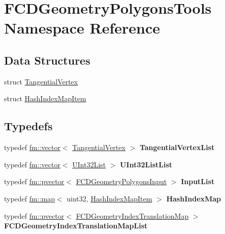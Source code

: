 \hypertarget{namespaceFCDGeometryPolygonsTools}{
\section{FCDGeometryPolygonsTools Namespace Reference}
\label{namespaceFCDGeometryPolygonsTools}
}
\subsection*{Data Structures}
\begin{DoxyCompactItemize}
\item 
struct \hyperlink{structFCDGeometryPolygonsTools_1_1TangentialVertex}{TangentialVertex}
\item 
struct \hyperlink{structFCDGeometryPolygonsTools_1_1HashIndexMapItem}{HashIndexMapItem}
\end{DoxyCompactItemize}
\subsection*{Typedefs}
\begin{DoxyCompactItemize}
\item 
\hypertarget{namespaceFCDGeometryPolygonsTools_a324eb52831fd68edec9f4c53179cef54}{
typedef \hyperlink{classfm_1_1vector}{fm::vector}$<$ \hyperlink{structFCDGeometryPolygonsTools_1_1TangentialVertex}{TangentialVertex} $>$ {\bfseries TangentialVertexList}}
\label{namespaceFCDGeometryPolygonsTools_a324eb52831fd68edec9f4c53179cef54}

\item 
\hypertarget{namespaceFCDGeometryPolygonsTools_af4e70eb8c889999cd7be13dca990efd0}{
typedef \hyperlink{classfm_1_1vector}{fm::vector}$<$ \hyperlink{classfm_1_1vector}{UInt32List} $>$ {\bfseries UInt32ListList}}
\label{namespaceFCDGeometryPolygonsTools_af4e70eb8c889999cd7be13dca990efd0}

\item 
\hypertarget{namespaceFCDGeometryPolygonsTools_ab4f309281805c91af6496bb9bbbc99b2}{
typedef \hyperlink{classfm_1_1pvector}{fm::pvector}$<$ \hyperlink{classFCDGeometryPolygonsInput}{FCDGeometryPolygonsInput} $>$ {\bfseries InputList}}
\label{namespaceFCDGeometryPolygonsTools_ab4f309281805c91af6496bb9bbbc99b2}

\item 
\hypertarget{namespaceFCDGeometryPolygonsTools_a1535da557d2ffde70da72e32142eb4cc}{
typedef \hyperlink{classfm_1_1map}{fm::map}$<$ uint32, \hyperlink{structFCDGeometryPolygonsTools_1_1HashIndexMapItem}{HashIndexMapItem} $>$ {\bfseries HashIndexMap}}
\label{namespaceFCDGeometryPolygonsTools_a1535da557d2ffde70da72e32142eb4cc}

\item 
\hypertarget{namespaceFCDGeometryPolygonsTools_a4a62dc14a8576eecb47c671629babd95}{
typedef \hyperlink{classfm_1_1pvector}{fm::pvector}$<$ \hyperlink{classfm_1_1map}{FCDGeometryIndexTranslationMap} $>$ {\bfseries FCDGeometryIndexTranslationMapList}}
\label{namespaceFCDGeometryPolygonsTools_a4a62dc14a8576eecb47c671629babd95}

\end{DoxyCompactItemize}
